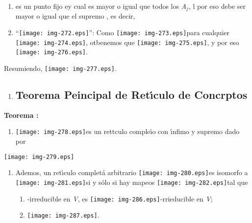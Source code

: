 \documentclass[12pt]{article}
\begin{document}
\begin{enumerate}
	\item %
es un punto fijo ey cual es mayor o igual que todos los \textit{A$_{j}$}, l por eso
debe ser mayor o igual que el supremo
, es decir,
	\item ``\texttt{[image: img-272.eps]}'': Como
\texttt{[image: img-273.eps]}para cualquier
\texttt{[image: img-274.eps]}, otbenemos que
\texttt{[image: img-275.eps]}, y por eso
\texttt{[image: img-276.eps]}.
\end{enumerate}

Resumiendo, \texttt{[image: img-277.eps]}.

\begin{enumerate}
	\item \subsection{Teorema Peincipal de Ret\'{\i}culo de Concrptos}
\end{enumerate}

\textbf{Teorema :}

\begin{enumerate}
	\item \texttt{[image: img-278.eps]}es un rettculo comple\'{\i}o con
\'{\i}nfimo y supremo dado por
\end{enumerate}
\texttt{[image: img-279.eps]}
\begin{enumerate}
	\item Ademos, un ret\'{\i}culo complet\'{a} arbitrario
\texttt{[image: img-280.eps]}es isomorfo a
\texttt{[image: img-281.eps]}si y s\'{o}lo si hay mapeos
\texttt{[image: img-282.eps]}tal que

\begin{enumerate}
	\item %
-irreducible en \textit{V},
es
\texttt{[image: img-286.eps]}-rrieducible en \textit{V};
	\item \texttt{[image: img-287.eps]}.
\end{enumerate}
\end{enumerate}
\end{document}
